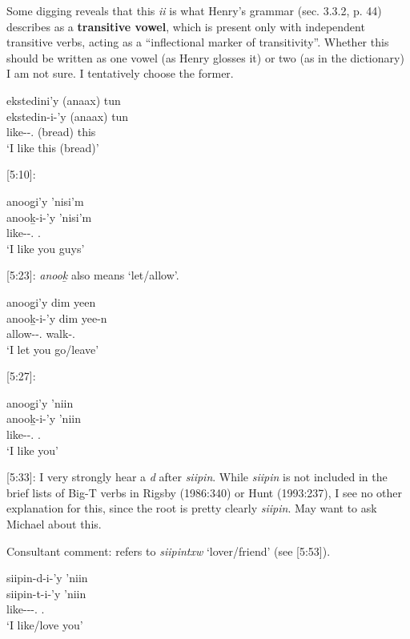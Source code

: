 Some digging reveals that this \textit{ii} is what Henry's grammar (sec. 3.3.2, p. 44) describes as a \textbf{transitive vowel}, which is present only with independent transitive verbs, acting as a ``inflectional marker of transitivity''. Whether this should be written as one vowel (as Henry glosses it) or two (as in the dictionary) I am not sure. I tentatively choose the former.
\begin{exe}
    \ex \glll ekstedini'y (anaax) tun \\
    ekstedin-i-'y (anaax) tun \\
    like-\Tr{}-\Fsg.\Ii{} (bread) this \\
    `I like this (bread)'
\end{exe}

[5:10]:

\begin{exe}
    \ex \glll anoog̱i'y 'nisi'm \\
    anooḵ-i-'y 'nisi'm\\
    like-\Tr{}-\Fsg.\Ii{} \Spl{}.\Iii{} \\
    `I like you guys'
\end{exe}

[5:23]: \textit{anooḵ} also means `let/allow'.
\begin{exe}
    \ex \glll anoog̱i'y dim yeen \\
    anooḵ-i-'y dim yee-n\\
    allow-\Tr{}-\Fsg.\Ii{} \Prosp{} walk-\Ssg{}.\Ii{} \\
    `I let you go/leave'
\end{exe}

[5:27]: 
\begin{exe}
    \ex \glll anoog̱i'y 'niin \\
    anooḵ-i-'y 'niin \\
    like-\Tr{}-\Fsg.\Ii{} \Ssg{}.\Iii{} \\
    `I like you'
\end{exe}

[5:33]: I very strongly hear a \textit{d} after \textit{siipin}. While \textit{siipin} is not included in the brief lists of Big-T verbs in Rigsby (1986:340) or Hunt (1993:237), I see no other explanation for this, since the root is pretty clearly \textit{siipin}. May want to ask Michael about this.

Consultant comment: refers to \textit{siipintxw} `lover/friend' (see [5:53]).
\begin{exe}
    \ex \glll siipin-d-i-'y 'niin \\
    siipin-t-i-'y 'niin \\
    like-\T{}-\Tr{}-\Fsg.\Ii{} \Ssg{}.\Iii{} \\
    `I like/love you'
\end{exe}

